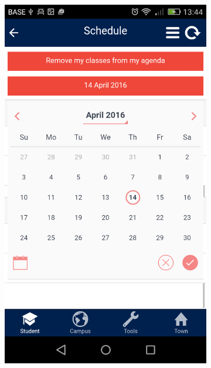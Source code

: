 \documentclass{eplmastersthesis}
\begin{document}
\begin{figure}
\begin{subfigure}[b]{0.3\textwidth}
        \includegraphics[width=\textwidth]{Images/Application_screens/Screenshot_2016-06-06-13-44-26.png}
    \end{subfigure}
    ~ %
    \begin{subfigure}[b]{0.3\textwidth}

\end{subfigure}
\end{figure}
\end{document}

